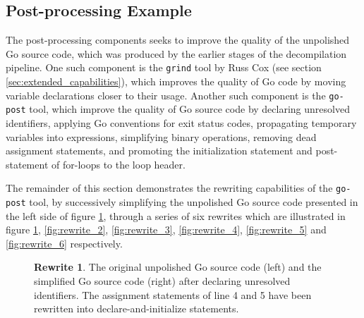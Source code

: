 
\subsection{Post-processing Example}
\label{app:post-processing_example}

The post-processing components seeks to improve the quality of the unpolished Go source code, which was produced by the earlier stages of the decompilation pipeline. One such component is the \texttt{grind} tool by Russ Cox (see section \ref{sec:extended_capabilities}), which improves the quality of Go code by moving variable declarations closer to their usage. Another such component is the \texttt{go-post} tool, which improve the quality of Go source code by declaring unresolved identifiers, applying Go conventions for exit status codes, propagating temporary variables into expressions, simplifying binary operations, removing dead assignment statements, and promoting the initialization statement and post-statement of for-loops to the loop header.

The remainder of this section demonstrates the rewriting capabilities of the \texttt{go-post} tool, by successively simplifying the unpolished Go source code presented in the left side of figure \ref{fig:rewrite_1}, through a series of six rewrites which are illustrated in figure \ref{fig:rewrite_1}, \ref{fig:rewrite_2}, \ref{fig:rewrite_3}, \ref{fig:rewrite_4}, \ref{fig:rewrite_5} and \ref{fig:rewrite_6} respectively.

\begin{figure}[htbp]
	\centering
	\begin{subfigure}[t]{0.45\textwidth}
		
	\end{subfigure}
	\qquad
	\begin{subfigure}[t]{0.45\textwidth}
		
	\end{subfigure}
	\caption{\textbf{Rewrite 1}. The original unpolished Go source code (left) and the simplified Go source code (right) after declaring unresolved identifiers. The assignment statements of line 4 and 5 have been rewritten into declare-and-initialize statements.}
	\label{fig:rewrite_1}
\end{figure}

